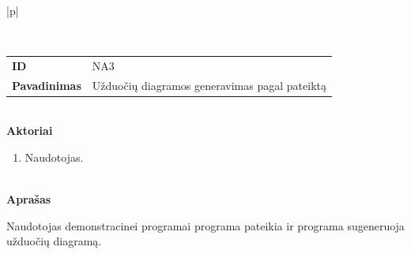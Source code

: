 \begin{center}
    \begin{longtable}{|p{\textwidth}|}
    \caption{Užduočių diagramos generavimo pagal pateiktą \DVCM{} modelį naudojimo atvejis}
	\label{tab:program_re_uc_generation}
	\\ \hline
    \begin{tabular}{@{}p{3.5cm}p{12cm}}
    	\\
    	\textbf{ID} & NA3
    	\\
    	\textbf{Pavadinimas} & Užduočių diagramos generavimas pagal pateiktą \DVCM{}
    	\\
    \end{tabular}
    \\
    \textbf{Aktoriai}
    \begin{enumerate}
    	\item Naudotojas.
	\end{enumerate}
    \\
    \textbf{Aprašas}

      Naudotojas demonstracinei programai programa pateikia \DVCM{} ir programa sugeneruoja užduočių diagramą.


\end{longtable}
\end{center}
